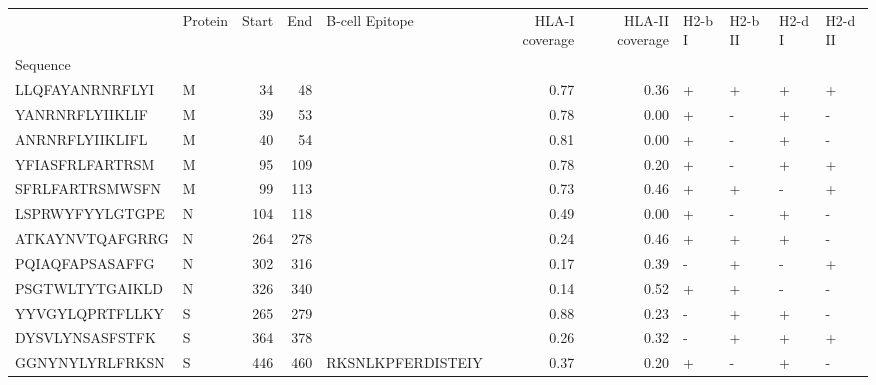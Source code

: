 \begin{tabular}{llrrlrrllll}
\toprule
{} & Protein &  Start &   End &     B-cell Epitope &  HLA-I coverage &  HLA-II coverage & H2-b I & H2-b II & H2-d I & H2-d II \\
Sequence        &         &        &       &                    &                 &                  &        &         &        &         \\
\midrule
LLQFAYANRNRFLYI &       M &     34 &    48 &                    &            0.77 &             0.36 &      + &       + &      + &       + \\
YANRNRFLYIIKLIF &       M &     39 &    53 &                    &            0.78 &             0.00 &      + &       - &      + &       - \\
ANRNRFLYIIKLIFL &       M &     40 &    54 &                    &            0.81 &             0.00 &      + &       - &      + &       - \\
YFIASFRLFARTRSM &       M &     95 &   109 &                    &            0.78 &             0.20 &      + &       - &      + &       + \\
SFRLFARTRSMWSFN &       M &     99 &   113 &                    &            0.73 &             0.46 &      + &       + &      - &       + \\
LSPRWYFYYLGTGPE &       N &    104 &   118 &                    &            0.49 &             0.00 &      + &       - &      + &       - \\
ATKAYNVTQAFGRRG &       N &    264 &   278 &                    &            0.24 &             0.46 &      + &       + &      + &       - \\
PQIAQFAPSASAFFG &       N &    302 &   316 &                    &            0.17 &             0.39 &      - &       + &      - &       + \\
PSGTWLTYTGAIKLD &       N &    326 &   340 &                    &            0.14 &             0.52 &      + &       + &      - &       - \\
YYVGYLQPRTFLLKY &       S &    265 &   279 &                    &            0.88 &             0.23 &      - &       + &      + &       - \\
DYSVLYNSASFSTFK &       S &    364 &   378 &                    &            0.26 &             0.32 &      - &       + &      + &       + \\
GGNYNYLYRLFRKSN &       S &    446 &   460 &  RKSNLKPFERDISTEIY &            0.37 &             0.20 &      + &       - &      + &       - \\

\end{tabular}

